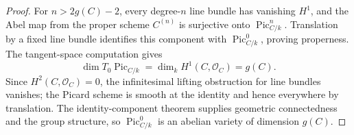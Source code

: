 \begin{proof}
  For \(n>2g(C)-2\), every degree-\(n\) line bundle has vanishing \(H^1\), and
  the Abel map from the proper scheme \(C^{(n)}\) is surjective onto
  \(\operatorname{Pic}^n_{C/k}\).  Translation by a fixed line bundle
  identifies this component with \(\operatorname{Pic}^0_{C/k}\), proving
  properness.  The tangent-space computation gives
  \[
    \dim T_0\operatorname{Pic}_{C/k}=\dim_kH^1(C,\mathcal O_C)=g(C).
  \]
  Since \(H^2(C,\mathcal O_C)=0\), the infinitesimal lifting obstruction for
  line bundles vanishes; the Picard scheme is smooth at the identity and
  hence everywhere by translation.  The identity-component theorem supplies
  geometric connectedness and the group structure, so
  \(\operatorname{Pic}^0_{C/k}\) is an abelian variety of dimension \(g(C)\).
\end{proof}
